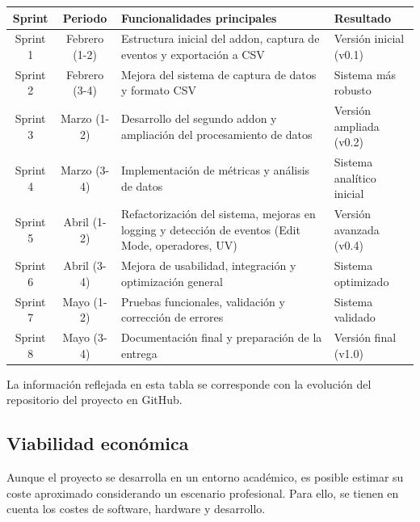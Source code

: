 \begin{center}
\begin{tabular}{|c|c|p{5cm}|p{4cm}|}
\hline
\textbf{Sprint} & \textbf{Periodo} & \textbf{Funcionalidades principales} & \textbf{Resultado} \\
\hline

Sprint 1 & Febrero (1-2) & Estructura inicial del addon, captura de eventos y exportación a CSV & Versión inicial (v0.1) \\
\hline

Sprint 2 & Febrero (3-4) & Mejora del sistema de captura de datos y formato CSV & Sistema más robusto \\
\hline

Sprint 3 & Marzo (1-2) & Desarrollo del segundo addon y ampliación del procesamiento de datos & Versión ampliada (v0.2) \\
\hline

Sprint 4 & Marzo (3-4) & Implementación de métricas y análisis de datos & Sistema analítico inicial \\
\hline

Sprint 5 & Abril (1-2) & Refactorización del sistema, mejoras en logging y detección de eventos (Edit Mode, operadores, UV) & Versión avanzada (v0.4) \\
\hline

Sprint 6 & Abril (3-4) & Mejora de usabilidad, integración y optimización general & Sistema optimizado \\
\hline

Sprint 7 & Mayo (1-2) & Pruebas funcionales, validación y corrección de errores & Sistema validado \\
\hline

Sprint 8 & Mayo (3-4) & Documentación final y preparación de la entrega & Versión final (v1.0) \\
\hline

\end{tabular}
\end{center}

La información reflejada en esta tabla se corresponde con la evolución del repositorio del proyecto en GitHub.

\subsection{Viabilidad económica}

Aunque el proyecto se desarrolla en un entorno académico, es posible estimar su coste aproximado considerando un escenario profesional. Para ello, se tienen en cuenta los costes de software, hardware y desarrollo.

